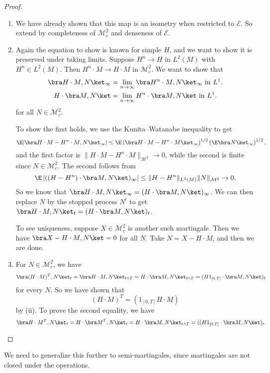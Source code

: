 \documentclass[a4paper]{article}
\begin{document}
\begin{proof}\leavevmode
  \begin{enumerate}
    \item We have already shown that this map is an isometry when restricted to $\mathcal{E}$. So extend by completeness of $\mathcal{M}_c^2$ and denseness of $\mathcal{E}$.
    \item Again the equation to show is known for simple $H$, and we want to show it is preserved under taking limits. Suppose $H^n \to H$ in $L^2(M)$ with $H^n \in L^2(M)$. Then $H^n \cdot M \to H \cdot M$ in $\mathcal{M}_c^2$. We want to show that
      \begin{align*}
        \bra H \cdot M, N\ket_\infty &= \lim_{n \to \infty} \bra H^n \cdot M, N\ket_\infty\text{ in }L^1.\\
        H \cdot \bra M, N\ket &= \lim_{n \to \infty} H^n \cdot \bra M, N\ket\text{ in }L^1.
      \end{align*}
      for all $N \in \mathcal{M}_c^2$.

      To show the first holds, we use the Kunita--Watanabe inequality to get
      \[
        \E |\bra H \cdot M - H^n \cdot M, N\ket_\infty| \leq \E \left(\bra H \cdot M - H^n \cdot M\ket_\infty\right)^{1/2} \left(\E \bra N\ket_\infty\right)^{1/2},
      \]
      and the first factor is $\|H \cdot M - H^n \cdot M\|_{\mathcal{M}^2} \to 0$, while the second is finite since $N \in \mathcal{M}_c^2$. The second follows from
      \[
        \E \left|((H - H^n) \cdot \bra M, N\ket)_\infty\right| \leq \|H - H^n\|_{L^2(M)} \|N\|_{\mathcal{M}^2} \to 0.
      \]
      So we know that $\bra H \cdot M, N\ket_\infty = (H \cdot \bra M, N\ket)_\infty$. We can then replace $N$ by the stopped process $N^t$ to get $\bra H \cdot M, N\ket_t = (H \cdot \bra M, N\ket)_t$.

      To see uniqueness, suppose $X \in \mathcal{M}_c^2$ is another such martingale. Then we have $\bra X - H \cdot M, N\ket = 0$ for all $N$. Take $N = X - H \cdot M$, and then we are done.
    \item For $N \in \mathcal{M}^2_c$, we have
      \[
        \bra (H \cdot M)^T, N\ket_t = \bra H \cdot M, N \ket_{t \wedge T} = H \cdot \bra M, N\ket_{t \wedge T} = (H 1_{[0, T]} \cdot \bra M, N\ket)_t
      \]
      for every $N$. So we have shown that
      \[
        (H \cdot M)^T = (1_{[0, T]} H \cdot M)
      \]
      by (ii). To prove the second equality, we have
      \[
        \bra H \cdot M^T, N\ket_t = H \cdot \bra M^T, N\ket_t = H \cdot \bra M, N\ket_{t \wedge T} = ((H1_{[0, T]} \cdot \bra M, N\ket)_t.\qedhere
      \]%
  \end{enumerate}
\end{proof}
We need to generalize this further to semi-martingales, since martingales are not closed under the operations.
\end{document}
